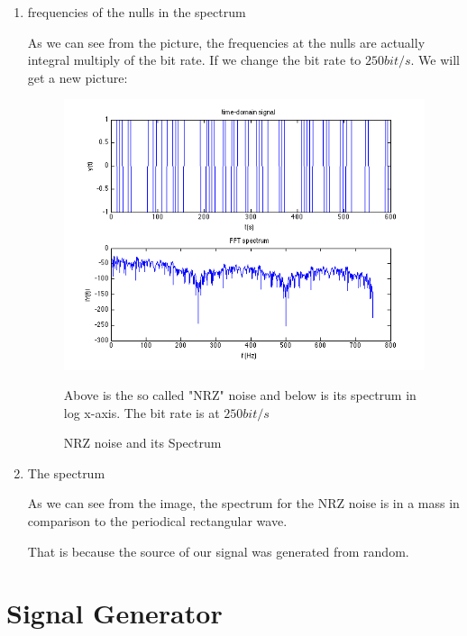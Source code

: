 \documentclass[11pt]{article}
\begin{document}
\begin{enumerate}
\item{frequencies of the nulls in the spectrum}

As we can see from the picture, the frequencies at the nulls are actually integral multiply of the bit rate.
\FloatBarrier
If we change the bit rate to $250 bit/s$. We will get a new picture:

\begin{figure}[!h]
\includegraphics[scale=0.6]{elec_2_3.png}
\caption{ NRZ noise and its Spectrum}

\begin{minipage}{0.75\textwidth}
{\footnotesize Above is the so called "NRZ" noise and below is its spectrum in log x-axis. The bit rate is at $250 bit/s$}
\end{minipage}
\end{figure}
\FloatBarrier

\item{The spectrum}

As we can see from the image, the spectrum for the NRZ noise is in a mass in comparison to the periodical rectangular wave.

That is because the source of our signal was generated from random.

\end{enumerate}



\section{Signal Generator}
\end{document}
